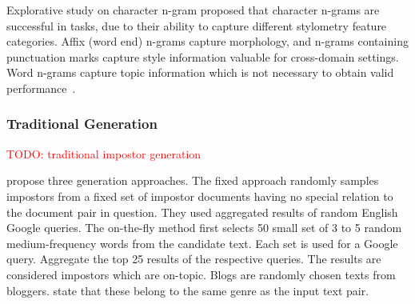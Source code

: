 

Explorative study on character n-gram proposed that character n-grams are successful in \ai{} tasks, due to their ability to capture different stylometry feature categories.
Affix (word end) n-grams capture morphology, and n-grams containing punctuation marks capture style information valuable for cross-domain settings.
Word n-grams capture topic information which is not necessary to obtain valid performance~\citep{Sapkota_ngrams_2015}.


\subsubsection{Traditional \imp{} Generation}
\label{subsubsec:traditional_impostor_generation}

\textcolor{red}{TODO: traditional impostor generation}


\citet{koppel_determining_2014} propose three \imp{} generation approaches.
The fixed approach randomly samples impostors from a fixed set of impostor documents having no special relation to the document pair in question.
They used aggregated results of random English Google queries.
The on-the-fly method first selects 50 small set of 3 to 5 random medium-frequency words from the candidate text.
Each set is used for a Google query.
Aggregate the top 25 results of the respective queries.
The results are considered impostors which are on-topic.
Blogs \imps{} are randomly chosen texts from bloggers.
\citet{koppel_determining_2014} state that these \imps{} belong to the same genre as the input text pair.



